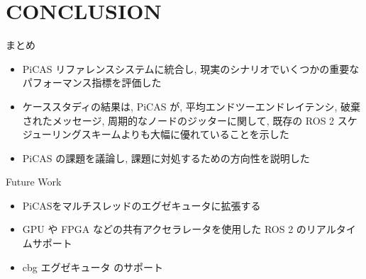 
\section{CONCLUSION}
\label{sec: conclusion}

\begin{frame}{まとめ}
    \begin{itemize}
        \item PiCAS リファレンスシステムに統合し, 現実のシナリオでいくつかの重要なパフォーマンス指標を評価した
        \item ケーススタディの結果は, PiCAS が, 平均エンドツーエンドレイテンシ, 破棄されたメッセージ, 周期的なノードのジッターに関して, 既存の ROS 2 スケジューリングスキームよりも大幅に優れていることを示した
        \item PiCAS の課題を議論し, 課題に対処するための方向性を説明した
    \end{itemize}
\end{frame}

\begin{frame}{Future Work}
    \begin{itemize}
        \item PiCASをマルチスレッドのエグゼキュータに拡張する
        \item GPU や FPGA などの共有アクセラレータを使用した ROS 2 のリアルタイムサポート
        \item cbg エグゼキュータ \cite{yang2020exploring} のサポート
    \end{itemize}
\end{frame}
